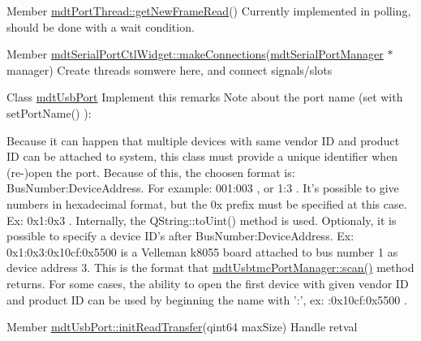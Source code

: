 \label{todo__todo000014}
\hypertarget{todo__todo000014}{}
 
\begin{DoxyDescription}
\item[Member \hyperlink{classmdt_port_thread_a611211e56620ec9c699019452716e4fc}{mdtPortThread::getNewFrameRead}() ]Currently implemented in polling, should be done with a wait condition.
\end{DoxyDescription}

\label{todo__todo000027}
\hypertarget{todo__todo000027}{}
 
\begin{DoxyDescription}
\item[Member \hyperlink{classmdt_serial_port_ctl_widget_a9dce60a846cbf24d7ceab099ff147c18}{mdtSerialPortCtlWidget::makeConnections}(\hyperlink{classmdt_serial_port_manager}{mdtSerialPortManager} $\ast$manager) ]Create threads somwere here, and connect signals/slots 
\end{DoxyDescription}

\label{todo__todo000022}
\hypertarget{todo__todo000022}{}
 
\begin{DoxyDescription}
\item[Class \hyperlink{classmdt_usb_port}{mdtUsbPort} ]Implement this remarks Note about the port name (set with setPortName() ):\par
 Because it can happen that multiple devices with same vendor ID and product ID can be attached to system, this class must provide a unique identifier when (re-\/)open the port. Because of this, the choosen format is: BusNumber:DeviceAddress. For example: 001:003 , or 1:3 . It's possible to give numbers in hexadecimal format, but the 0x prefix must be specified at this case. Ex: 0x1:0x3 . Internally, the QString::toUint() method is used. Optionaly, it is possible to specify a device ID's after BusNumber:DeviceAddress. Ex: 0x1:0x3:0x10cf:0x5500 is a Velleman k8055 board attached to bus number 1 as device address 3. This is the format that \hyperlink{classmdt_port_manager_ad56afb411ab5468005fca04767557ece}{mdtUsbtmcPortManager::scan()} method returns. For some cases, the ability to open the first device with given vendor ID and product ID can be used by beginning the name with ':', ex: :0x10cf:0x5500 . 
\end{DoxyDescription}

\label{todo__todo000017}
\hypertarget{todo__todo000017}{}
 
\begin{DoxyDescription}
\item[Member \hyperlink{classmdt_usb_port_a5e380852b8726f71e8558c86cba5bd1f}{mdtUsbPort::initReadTransfer}(qint64 maxSize) ]Handle retval 
\end{DoxyDescription}

